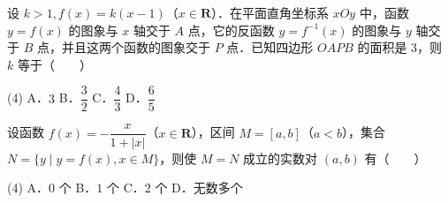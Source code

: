 \begin{question}
设 $k > 1, f(x) = k(x - 1)$（$x \in \mathbf{R}$）．在平面直角坐标系 $xOy$ 中，函数 $y = f(x)$ 的图象与 $x$ 轴交于 $A$ 点，它的反函数 $y = f^{-1}(x)$ 的图象与 $y$ 轴交于 $B$ 点，并且这两个函数的图象交于 $P$ 点．已知四边形 $OAPB$ 的面积是 3，则 $k$ 等于\mbox{（　　）}

\begin{gkopts}(4)
\task A．$3$
\task B．$\dfrac{3}{2}$
\task C．$\dfrac{4}{3}$
\task D．$\dfrac{6}{5}$
\end{gkopts}

\end{question}
\begin{question}
设函数 $f(x) = -\dfrac{x}{1 + |x|}$（$x \in \mathbf{R}$），区间 $M = [a, b]$（$a < b$），集合 $N = \{y \mid y = f(x), x \in M\}$，则使 $M = N$ 成立的实数对 $(a, b)$ 有\mbox{（　　）}

\begin{gkopts}(4)
\task A．$0$ 个
\task B．$1$ 个
\task C．$2$ 个
\task D．无数多个
\end{gkopts}

\end{question}

